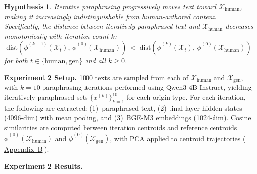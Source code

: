 \documentclass[runningheads]{llncs}
\newcommand{\appref}[1]{%
  \href{https://github.com/JonathanZha47/PadBen-Paraphrase-Attack-Benchmark/blob/main/docs/padben_icann_appendix.pdf}{Appendix~#1}%
}
\newtheorem{hypothesis}{Hypothesis}
\begin{document}
\begin{hypothesis}
\label{hyp:laundering_convergence}
Iterative paraphrasing progressively moves text toward 
$\mathcal{X}_{\text{human}}$, making it increasingly indistinguishable 
from human-authored content. Specifically, the distance between 
iteratively paraphrased text and $\mathcal{X}_{\text{human}}$ decreases 
monotonically with iteration count $k$:
\begin{equation}
    \text{dist}\!\left(\bar{\phi}^{(k+1)}(\mathcal{X}_t),\,
    \bar{\phi}^{(0)}(\mathcal{X}_{\text{human}})\right)
    \;<\;
    \text{dist}\!\left(\bar{\phi}^{(k)}(\mathcal{X}_t),\,
    \bar{\phi}^{(0)}(\mathcal{X}_{\text{human}})\right)
    \label{eq:h2}
\end{equation}
for both $t \in \{\text{human}, \text{gen}\}$ and all $k \geq 0$. 
\end{hypothesis}

\noindent\textbf{Experiment 2 Setup.} 1000 texts are sampled from each 
of $\mathcal{X}_{\text{human}}$ and $\mathcal{X}_{\text{gen}}$, with 
$k=10$ paraphrasing iterations performed using Qwen3-4B-Instruct, 
yielding iteratively paraphrased sets 
$\{x^{(k)}\}_{k=1}^{10}$ for each origin type. For each iteration, 
the following are extracted: (1)~paraphrased text, (2)~final layer 
hidden states (4096-dim) with mean pooling, and (3)~BGE-M3 embeddings 
(1024-dim). Cosine similarities are computed between iteration centroids 
and reference centroids $\bar{\phi}^{(0)}(\mathcal{X}_{\text{human}})$ 
and $\bar{\phi}^{(0)}(\mathcal{X}_{\text{gen}})$, with PCA applied to 
centroid trajectories (\appref{B}).

\noindent\textbf{Experiment 2 Results.}
\end{document}
